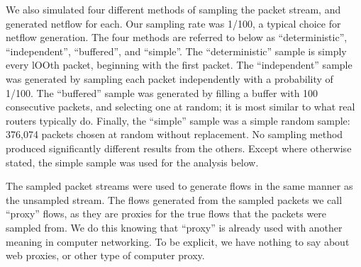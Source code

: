 \documentclass{paper}
\begin{document}
We also simulated four different methods of sampling the packet stream, and
generated netflow for each. Our sampling rate was 1/100, a typical choice for
netflow generation. The four methods are referred to below as ``deterministic'',
``independent'', ``buffered'', and ``simple''. The ``deterministic'' sample is
simply every lOOth packet, beginning with the first packet. The ``independent''
sample was generated by sampling each packet independently with a probability of
1/100. The ``buffered'' sample was generated by filling a buffer with 100
consecutive packets, and selecting one at random; it is most similar to what
real routers typically do. Finally, the ``simple'' sample was a simple random
sample: 376,074 packets chosen at random without replacement. No sampling method
produced significantly different results from the others. Except where otherwise
stated, the simple sample was used for the analysis below.

The sampled packet streams were used to generate flows in the same manner as the
unsampled stream. The flows generated from the sampled packets we call ``proxy''
flows, as they are proxies for the true flows that the packets were sampled
from. We do this knowing that ``proxy'' is already used with another meaning in
computer networking. To be explicit, we have nothing to say about web proxies,
or other type of computer proxy.
\end{document}
